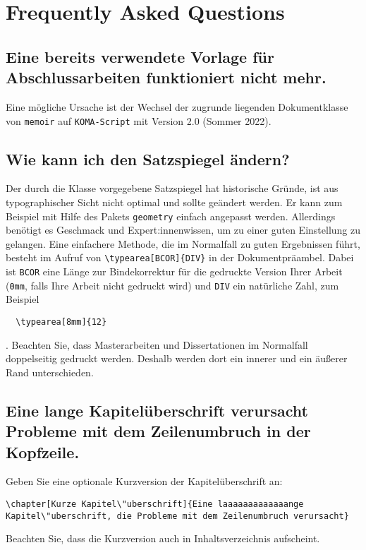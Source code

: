 \clearpage
\section{Frequently Asked Questions}

\subsection*{Eine bereits verwendete Vorlage für Abschlussarbeiten funktioniert nicht mehr.}

Eine m\"ogliche Ursache ist der Wechsel der zugrunde liegenden Dokumentklasse
von \verb|memoir| auf \verb|KOMA-Script| mit Version 2.0 (Sommer 2022).

\subsection*{Wie kann ich den Satzspiegel ändern?}

Der durch die Klasse vorgegebene Satzspiegel hat historische Gründe, ist aus
typographischer Sicht nicht optimal und sollte geändert werden. Er kann zum
Beispiel mit Hilfe des Pakets \verb|geometry| einfach angepasst werden.
Allerdings benötigt es Geschmack und Expert:innenwissen, um zu einer guten
Einstellung zu gelangen. Eine einfachere Methode, die im Normalfall zu guten
Ergebnissen führt, besteht im Aufruf von \verb|\typearea[BCOR]{DIV}| in der
Dokumentpräambel. Dabei ist \verb|BCOR| eine Länge zur Bindekorrektur für die
gedruckte Version Ihrer Arbeit (\verb|0mm|, falls Ihre Arbeit nicht gedruckt
wird) und \verb|DIV| ein natürliche Zahl, zum Beispiel
\begin{verbatim}
  \typearea[8mm]{12}
\end{verbatim}
\cite{kohm20}. Beachten Sie, dass Masterarbeiten und Dissertationen im
Normalfall doppelseitig gedruckt werden. Deshalb werden dort ein innerer und ein
äußerer Rand unterschieden.

\subsection*{Eine lange Kapitel\"uberschrift verursacht Probleme mit dem
  Zeilenumbruch in der Kopfzeile.}

Geben Sie eine optionale Kurzversion der Kapitel\"uberschrift an:
\begin{verbatim}
\chapter[Kurze Kapitel\"uberschrift]{Eine laaaaaaaaaaaaange
Kapitel\"uberschrift, die Probleme mit dem Zeilenumbruch verursacht}
\end{verbatim}
Beachten Sie, dass die Kurzversion auch in Inhaltsverzeichnis aufscheint.

